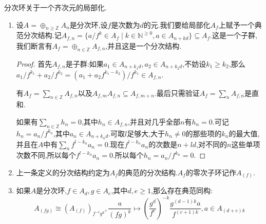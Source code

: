分次环关于一个齐次元的局部化.
\begin{enumerate}
	\item 设$A=\oplus_{n\ge\mathbb{Z}}A_n$是分次环,设$f$是次数为$d$的元.我们要给局部化$A_f$上赋予一个典范分次结构.记$A_{f,n}=\{a/f^k\in A_f\mid k\in\mathbb{N}^{\ge0},a\in A_{n+kd}\}\subseteq A_f$.这是一个子群,我们断言有$A_f=\oplus_{n\in\mathbb{Z}}A_{f,n}$,并且这是一个分次结构.
	\begin{proof}
		
		首先$A_{f,n}$是子群:如果$a_1\in A_{n+k_1d},a_2\in A_{n+k_2d}$,不妨设$k_1\ge k_2$,那么$a_1/f^{k_1}+a_2/f^{k_2}=(a_1+a_2f^{k_1-k_2})/f^{k_1}\in A_{f,n}$.
		
		有$A_f=\sum_{n\in\mathbb{Z}}A_{f,n}$以及$A_{f,m}A_{f,n}\subseteq A_{f,m+n}$.最后只需验证$A_f=\sum_nA_{f,n}$是直和.
		
		如果有$\sum_{n\in\mathbb{Z}}h_n=0$,其中$h_n\in A_{f,n}$,并且对几乎全部$n$有$h_n=0$.可记$h_n=a_n/f^{k_n}$,其中$a_n\in A_{n+k_nd}$.可取$l$足够大,大于$h_n\not=0$的那些项的$k_n$的最大值,并且在$A$中有$\sum_nf^{l-k_n}a_n=0$.现在$f^{l-k_n}a_n$的次数是$n+ld$,对不同的$n$这些单项次数不同,所以每个$f^{l-k_n}a_n=0$.所以每个$h_n=a_n/f^{k_n}=0$.
	\end{proof}
    \item 上一条定义的分次结构约定为$A_f$的典范的分次结构.$A_f$的零次子环记作$A_{(f)}$.
    \item 如果$A$是分次环,$f\in A_d,g\in A_e$,其中$d,e\ge1$,那么存在典范同构:
    $$A_{(fg)}\cong (A_{(f)})_{f^{-e}g^d},\frac{a}{(fg)^k}\mapsto\left(\frac{g^d}{f^e}\right)^{-k}\frac{g^{(d-1)k}a}{f^{(e+1)k}},a\in A_{(d+e)k}$$
\end{enumerate}

